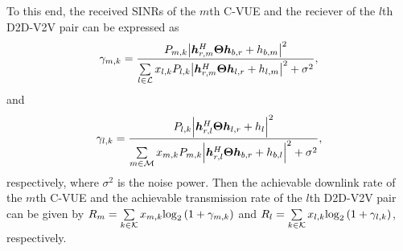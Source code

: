 \documentclass[journal]{IEEEtran}
\begin{document}
To this end, the received SINRs of the $m$th C-VUE and the reciever of the $l$th D2D-V2V pair can be expressed as
\begin{equation}
{\gamma _{m,k}} = \frac{{{P_{m,k}}{{\left| {\bm{h}_{r,m}^H{\bf{\Theta }}{\bm{h}_{b,r}} + {h_{b,m}}} \right|}^2}}}{{\sum\limits_{l \in {\cal L}} {{x_{l,k}}{P_{l,k}}{{\left| {\bm{h}_{r,m}^H{\bf{\Theta }}{\bm{h}_{l,r}} + {h_{l,m}}} \right|}^2}}  + {\sigma ^2}}},
\end{equation}
and
\begin{equation}
{\gamma _{l,k}} = \frac{{{P_{l,k}}{{\left| {\bm{h}_{r,l}^H{\bf{\Theta }}{\bm{h}_{l,r}} + {h_l}} \right|}^2}}}{{\sum\limits_{m \in {\cal M}} {{x_{m,k}}{P_{m,k}}{{\left| {\bm{h}_{r,l}^H{\bf{\Theta }}{\bm{h}_{b,r}} + {h_{b,l}}} \right|}^2}}  + {\sigma ^2}}},
\end{equation}
respectively, where ${\sigma ^2}$ is the noise power. Then the achievable downlink rate of the $m$th C-VUE and the achievable transmission rate of the $l$th D2D-V2V pair can be given by $ {R_m} = \sum\limits_{k \in {\cal K}} {{x_{m,k}}{{\log }_2}\left( {1 + {\gamma _{m,k}}} \right)} $ and $ {R_l} = \sum\limits_{k \in {\cal K}} {{x_{l,k}}{{\log }_2}\left( {1 + {\gamma _{l,k}}} \right)} $, respectively.
\end{document}
